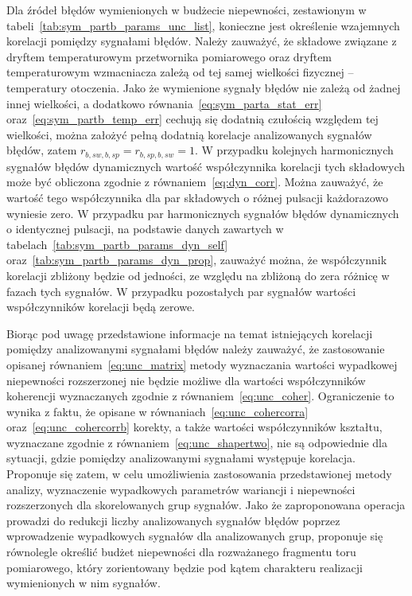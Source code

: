 Dla źródeł błędów wymienionych w budżecie niepewności, zestawionym w tabeli~\ref{tab:sym_partb_params_unc_list}, konieczne jest określenie wzajemnych korelacji pomiędzy sygnałami błędów. Należy zauważyć, że składowe związane z dryftem temperaturowym przetwornika pomiarowego oraz dryftem temperaturowym wzmacniacza zależą od tej samej wielkości fizycznej -- temperatury otoczenia. Jako że wymienione sygnały błędów nie zależą od żadnej innej wielkości, a dodatkowo równania~\eqref{eq:sym_parta_stat_err} oraz~\eqref{eq:sym_partb_temp_err} cechują się dodatnią czułością względem tej wielkości, można założyć pełną dodatnią korelacje analizowanych sygnałów błędów, zatem $r_{b,sw,b,sp} = r_{b,sp,b,sw} = 1$. W przypadku kolejnych harmonicznych sygnałów błędów dynamicznych wartość współczynnika korelacji tych składowych może być obliczona zgodnie z równaniem~\eqref{eq:dyn_corr}. Można zauważyć, że wartość tego współczynnika dla par składowych o różnej pulsacji każdorazowo wyniesie zero. W przypadku par harmonicznych sygnałów błędów dynamicznych o identycznej pulsacji, na podstawie danych zawartych w tabelach~\ref{tab:sym_partb_params_dyn_self} oraz~\ref{tab:sym_partb_params_dyn_prop}, zauważyć można, że współczynnik korelacji zbliżony będzie od jedności, ze względu na zbliżoną do zera różnicę w fazach tych sygnałów. W przypadku pozostałych par sygnałów wartości współczynników korelacji będą zerowe.

Biorąc pod uwagę przedstawione informacje na temat istniejących korelacji pomiędzy analizowanymi sygnałami błędów należy zauważyć, że zastosowanie opisanej równaniem~\eqref{eq:unc_matrix} metody wyznaczania wartości wypadkowej niepewności rozszerzonej nie będzie możliwe dla wartości współczynników koherencji wyznaczanych zgodnie z równaniem~\eqref{eq:unc_coher}. Ograniczenie to wynika z faktu, że opisane w równaniach~\eqref{eq:unc_cohercorra} oraz~\eqref{eq:unc_cohercorrb} korekty, a także wartości współczynników kształtu, wyznaczane zgodnie z równaniem~\eqref{eq:unc_shapertwo}, nie są odpowiednie dla sytuacji, gdzie pomiędzy analizowanymi sygnałami występuje korelacja. Proponuje się zatem, w celu umożliwienia zastosowania przedstawionej metody analizy, wyznaczenie wypadkowych parametrów wariancji i niepewności rozszerzonych dla skorelowanych grup sygnałów. Jako że zaproponowana operacja prowadzi do redukcji liczby analizowanych sygnałów błędów poprzez wprowadzenie wypadkowych sygnałów dla analizowanych grup, proponuje się równolegle określić budżet niepewności dla rozważanego fragmentu toru pomiarowego, który zorientowany będzie pod kątem charakteru realizacji wymienionych w nim sygnałów.


